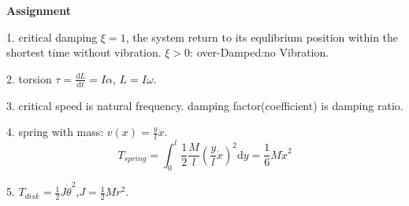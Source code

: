 \documentclass{article}
\begin{document}
\begin{multicols*}{2}
  \noindent\textbf{Assignment}
  
  1. critical damping $\xi=1$, the system return to its equlibrium position within the shortest time without vibration.
  $\xi>0$: over-Damped:no Vibration.
  
  2. torsion $\tau=\frac{\text{d}L}{\text{d}t}=I\alpha$, $L=I\omega$.
  
  3. critical speed is natural frequency. damping factor(coefficient) is damping ratio.

  4. spring with mass: $v(x)=\frac{y}{l}\dot{x}$.
  \begin{equation*}
    T_{spring}=\int_{0}^{l}\frac{1}{2}\frac{M}{l}(\frac{y}{l}\dot{x})^{2}\text{d}y
    =\frac{1}{6}M\dot{x}^{2}
  \end{equation*}

  5. $T_{disk}=\frac{1}{2}J\dot{\theta}^{2}$,$J=\frac{1}{2}Mr^{2}$.
  \end{multicols*}
\end{document}
